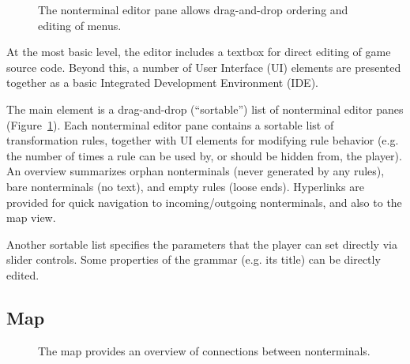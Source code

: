 \documentclass{acm_proc_article-sp}
\begin{document}
\begin{figure}
\centerline{  }
\caption{
\label{fig:editor}
The nonterminal editor pane allows drag-and-drop ordering and editing of menus.
}
\end{figure}

At the most basic level, the editor includes a textbox for direct editing of game source code.
Beyond this, a number of User Interface (UI)
elements are presented together as a basic Integrated Development Environment (IDE).

The main element is a drag-and-drop (``sortable'') list of nonterminal editor panes (Figure~\ref{fig:editor}).
Each nonterminal editor pane contains a sortable list of transformation rules,
together with UI elements for modifying rule behavior (e.g. the number of times
a rule can be used by, or should be hidden from, the player).
An overview summarizes orphan nonterminals (never generated by any rules),
bare nonterminals (no text), and empty rules (loose ends).
Hyperlinks are provided for quick navigation to incoming/outgoing nonterminals,
and also to the map view.

Another sortable list specifies the parameters that the player
can set directly via slider controls.
Some properties of the grammar (e.g. its title) can be directly edited.

\subsection{Map}

\begin{figure}
\centerline{  }
\caption{
\label{fig:map}
The map provides an overview of connections between nonterminals.
}
\end{figure}
\end{document}
